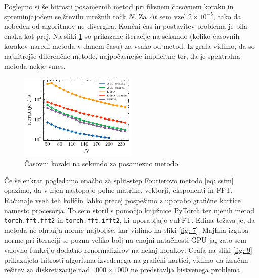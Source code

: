 \documentclass[11pt]{report}
\begin{document}
\newpage
\noindent
Poglejmo si še hitrosti posameznih metod pri fiksnem časovnem koraku in spreminjajočem se številu
mrežnih točk $N$. Za $\Delta t$ sem vzel $2 \times 10^{-5}$, tako da nobeden od algoritmov ne divergira.
Končni čas in postavitev problema je bila enaka kot prej.
Na sliki \ref{fig: 8} so prikazane iteracije na sekundo (koliko časovnih korakov naredi metoda v
danem času) za vsako od metod. Iz grafa vidimo, da so najhitrejše diferenčne metode, najpočasnejše
implicitne ter, da je spektralna metoda nekje vmes.

\begin{figure}[h!]
	\centering
	\includegraphics[width=0.5\textwidth]{times_all.pdf}
	\caption{Časovni koraki na sekundo za posamezno metodo.}
	\label{fig: 8}
\end{figure}

\noindent
Če še enkrat pogledamo enačbo za split-step Fourierovo metodo \ref{eq: ssfm} opazimo, da v njen
nastopajo polne matrike, vektorji, eksponenti in FFT. Računaje vseh teh količin lahko precej pospešimo
z uporabo grafične kartice namesto procesorja. To sem storil s pomočjo knjižnice PyTorch ter njenih metod
\texttt{torch.fft.fft2} in \texttt{torch.fft.ifft2}, ki uporabljajo cuFFT.
Edina težava je, da metoda ne ohranja norme najboljše, kar vidimo na sliki \ref{fig: 7}.
Majhna izguba norme pri iteraciji se pozna veliko bolj na enojni natačnosti GPU-ja, zato sem
valovno funkcijo dodatno renormalizirov na nekaj korakov.
Grafa na sliki \ref{fig: 9} prikazujeta hitrosti algoritma izvedenega na grafični kartici, vidimo da
izračun rešitev za diskretizacije nad $1000 \times 1000$ ne predstavlja bistvenega problema.
\end{document}
